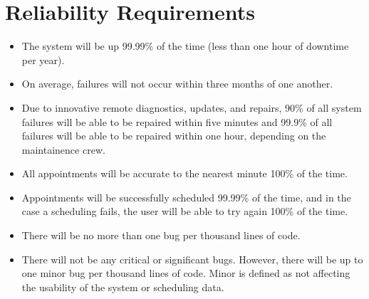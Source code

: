 \section{Reliability Requirements}
\begin{itemize}
\item The system will be up 99.99\% of the time (less than one hour of downtime per year).
\item On average, failures will not occur within three months of one another.
\item Due to innovative remote diagnostics, updates, and repairs, 90\% of all system failures will be able to be repaired within five minutes and 99.9\% of all failures will be able to be repaired within one hour, depending on the maintainence crew.
\item All appointments will be accurate to the nearest minute 100\% of the time.
\item Appointments will be successfully scheduled 99.99\% of the time, and in the case a scheduling fails, the user will be able to try again 100\% of the time.
\item There will be no more than one bug per thousand lines of code.
\item There will not be any critical or significant bugs. However, there will be up to one minor bug per thousand lines of code. Minor is defined as not affecting the usability of the system or scheduling data.
\end{itemize}

